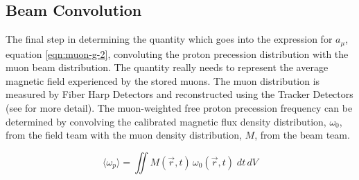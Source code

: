 \subsection{Beam Convolution}

The final step in determining the quantity which goes into the expression for $a_\mu$, equation \ref{eqn:muon-g-2}, convoluting the proton precession distribution with the muon beam distribution.  The quantity really needs to represent the average magnetic field experienced by the stored muons.  The muon distribution is measured by Fiber Harp Detectors and reconstructed using the Tracker Detectors (see \cite{e989-tdr} for more detail).  The muon-weighted free proton precession frequency can be determined by convolving the calibrated magnetic flux density distribution, $\omega_0$, from the field team with the muon density distribution, $M$, from the beam team.

\begin{equation}
\label{eqn:field-omega-p-avg}
\langle \omega_p \rangle = \iint M(\vec{r}, t) \, \omega_0(\vec{r}, t)\; dt\,dV
\end{equation}

